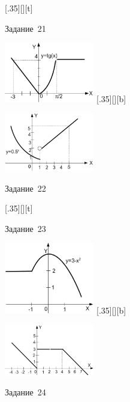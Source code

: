 \begin{figure}[H]
\begin{floatrow}
[.35\textwidth][\FBheight][t]
{\caption{Задание~21}
\label{ch03:refDrawing58}}
{\includegraphics[width=0.35\textwidth,keepaspectratio]{img/ris_3_59}}%
%
[.35\textwidth][\FBheight][b]
{\caption{Задание~22}
\label{ch03:refDrawing59}}
{\includegraphics[width=0.35\textwidth]{img/ris_3_60}}
\end{floatrow}
\end{figure}

\begin{figure}[H]
\begin{floatrow}
[.35\textwidth][\FBheight][t]
{\caption{Задание~23}
\label{ch03:refDrawing60}}
{\includegraphics[width=0.35\textwidth,keepaspectratio]{img/ris_3_61}}%
%
[.35\textwidth][\FBheight][b]
{\caption{Задание~24}
\label{ch03:refDrawing61}}
{\includegraphics[width=0.35\textwidth]{img/ris_3_62}}
\end{floatrow}
\end{figure}

